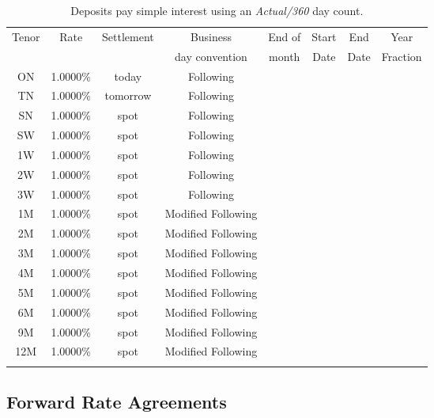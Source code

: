 \documentclass[11pt,reqno]{amsart}
\begin{document}
\begin{table}[tbp]
\label{tab:deposits} 
\begin{tabular}{cccccccc}
Tenor & Rate & Settlement & Business       & End of & Start & End  & Year \\ 
      &      &            & day convention & month   & Date  & Date & Fraction \\
ON & 1.0000\% & today & Following &  &  \\ 
TN & 1.0000\% & tomorrow & Following &  &  \\ 
SN & 1.0000\% & spot & Following &  &  \\ 
SW & 1.0000\% & spot & Following &  &  \\ 
1W & 1.0000\% & spot & Following &  &  \\ 
2W & 1.0000\% & spot & Following &  &  \\ 
3W & 1.0000\% & spot & Following &  &  \\ 
1M & 1.0000\% & spot & Modified Following &  &  \\ 
2M & 1.0000\% & spot & Modified Following &  &  \\ 
3M & 1.0000\% & spot & Modified Following &  &  \\ 
4M & 1.0000\% & spot & Modified Following &  &  \\ 
5M & 1.0000\% & spot & Modified Following &  &  \\ 
6M & 1.0000\% & spot & Modified Following &  &  \\ 
9M & 1.0000\% & spot & Modified Following &  &  \\ 
12M & 1.0000\% & spot & Modified Following &  &  \\ 
&  &  &  &  & 
\end{tabular}%
\caption{Deposits pay simple interest using an \emph{Actual/360} day count.}
\end{table}

\subsection{Forward Rate Agreements}
\end{document}
